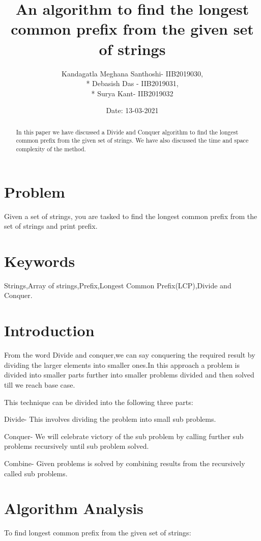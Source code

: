 \documentclass{article}
\title{\textbf{An algorithm to find the longest common prefix from the given set of strings}}
\author{Kandagatla Meghana Santhoshi- IIB2019030,\\* Debasish Das - IIB2019031, \\* Surya Kant- IIB2019032 }
\date{Date: 13-03-2021}
\begin{document}
\maketitle
\begin{abstract}
In this paper we have discussed a Divide and Conquer
algorithm to find the longest common prefix from the given set of strings. We have also discussed the time and space complexity of the method.
\end{abstract}

\begin{multicols}{2}

\section{Problem}
Given a set of strings, you are tasked to find the longest common prefix from the set of strings and print prefix.

\section{Keywords}
Strings,Array of strings,Prefix,Longest Common Prefix(LCP),Divide and Conquer.

\section{Introduction}
From the word Divide and conquer,we can say conquering the required result by  dividing the larger elements into smaller ones.In this approach a problem is divided into smaller parts further into smaller problems divided and then solved till we reach base case.

This technique can be divided into the following three parts:

Divide- This involves dividing the problem into small sub problems.

Conquer- We will celebrate victory of the sub problem by calling further sub problems recursively until sub problem solved.

Combine- Given problems is solved by combining results from the recursively called sub problems.

\section{Algorithm Analysis}
To find longest common prefix from the given set of strings:
 

\end{multicols}
\end{document}
